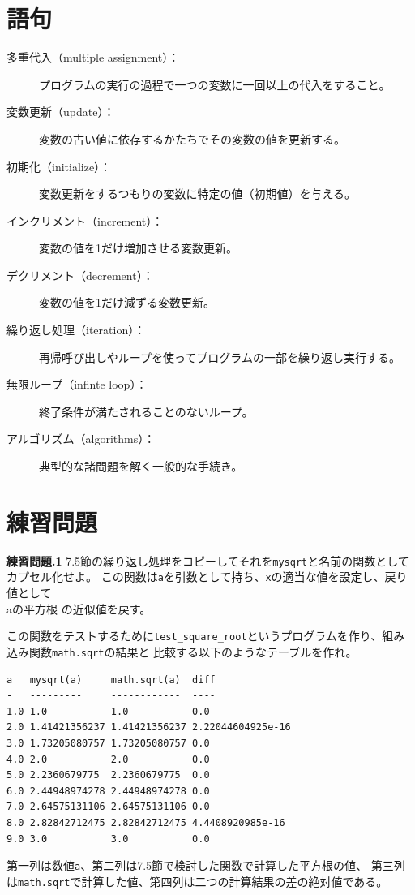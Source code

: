\documentclass[a4j,12pt,makeidx]{jbook}
\newcommand{\tp}{\thechapter}
\begin{document}
\section{語句}
\begin{description}

\item[多重代入（multiple assignment）：]プログラムの実行の過程で一つの変数に一回以上の代入をすること。 

\item[変数更新（update）：]変数の古い値に依存するかたちでその変数の値を更新する。 

\item[初期化（initialize）：]変数更新をするつもりの変数に特定の値（初期値）を与える。

\item[インクリメント（increment）：] 変数の値を1だけ増加させる変数更新。

\item[デクリメント（decrement）：] 変数の値を1だけ減ずる変数更新。

\item[繰り返し処理（iteration）：] 再帰呼び出しやループを使ってプログラムの一部を繰り返し実行する。

\item[無限ループ（infinte loop）：] 終了条件が満たされることのないループ。

\item[アルゴリズム（algorithms）：] 典型的な諸問題を解く一般的な手続き。

\end{description}

\section{練習問題}

\noindent
{\bf 練習問題\tp.1} 7.5節の繰り返し処理をコピーしてそれを{\tt mysqrt}と名前の関数としてカプセル化せよ。
この関数は{\tt a}を引数として持ち、{\tt x}の適当な値を設定し、戻り値として{\\ a}の平方根
の近似値を戻す。\par
この関数をテストするために{\tt test\_square\_root}というプログラムを作り、組み込み関数{\tt math.sqrt}の結果と
比較する以下のようなテーブルを作れ。
\begin{verbatim}
a   mysqrt(a)     math.sqrt(a)  diff
-   ---------     ------------  ----
1.0 1.0           1.0           0.0
2.0 1.41421356237 1.41421356237 2.22044604925e-16
3.0 1.73205080757 1.73205080757 0.0
4.0 2.0           2.0           0.0
5.0 2.2360679775  2.2360679775  0.0
6.0 2.44948974278 2.44948974278 0.0
7.0 2.64575131106 2.64575131106 0.0
8.0 2.82842712475 2.82842712475 4.4408920985e-16
9.0 3.0           3.0           0.0
\end{verbatim}
第一列は数値{\tt a}、第二列は7.5節で検討した関数で計算した平方根の値、
第三列は{\tt math.sqrt}で計算した値、第四列は二つの計算結果の差の絶対値である。 \\
\end{document}
